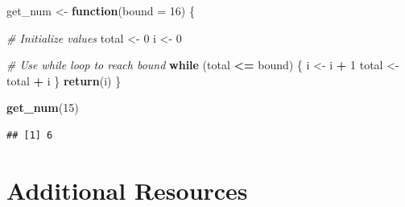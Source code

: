 \documentclass[
]{book}
\newenvironment{Shaded}{\begin{snugshade}}{\end{snugshade}}
\newcommand{\CommentTok}[1]{\textcolor[rgb]{0.56,0.35,0.01}{\textit{#1}}}
\newcommand{\ControlFlowTok}[1]{\textcolor[rgb]{0.13,0.29,0.53}{\textbf{#1}}}
\newcommand{\DataTypeTok}[1]{\textcolor[rgb]{0.13,0.29,0.53}{#1}}
\newcommand{\DecValTok}[1]{\textcolor[rgb]{0.00,0.00,0.81}{#1}}
\newcommand{\KeywordTok}[1]{\textcolor[rgb]{0.13,0.29,0.53}{\textbf{#1}}}
\newcommand{\NormalTok}[1]{#1}
\newcommand{\OperatorTok}[1]{\textcolor[rgb]{0.81,0.36,0.00}{\textbf{#1}}}
\newcommand{\StringTok}[1]{\textcolor[rgb]{0.31,0.60,0.02}{#1}}
\begin{document}
\begin{Shaded}
\begin{Highlighting}[]
\NormalTok{get_num <-}\StringTok{ }\ControlFlowTok{function}\NormalTok{(}\DataTypeTok{bound =} \DecValTok{16}\NormalTok{) \{}

    \CommentTok{# Initialize values}
\NormalTok{    total <-}\StringTok{ }\DecValTok{0}
\NormalTok{    i <-}\StringTok{ }\DecValTok{0}

    \CommentTok{# Use while loop to reach bound}
    \ControlFlowTok{while}\NormalTok{ (total }\OperatorTok{<=}\StringTok{ }\NormalTok{bound) \{}
\NormalTok{        i <-}\StringTok{ }\NormalTok{i }\OperatorTok{+}\StringTok{ }\DecValTok{1}
\NormalTok{        total <-}\StringTok{ }\NormalTok{total }\OperatorTok{+}\StringTok{ }\NormalTok{i}
\NormalTok{    \}}
    \KeywordTok{return}\NormalTok{(i)}
\NormalTok{\}}

\KeywordTok{get_num}\NormalTok{(}\DecValTok{15}\NormalTok{)}
\end{Highlighting}
\end{Shaded}

\begin{verbatim}
## [1] 6
\end{verbatim}

\hypertarget{additional-resources-5}{%
\section{Additional Resources}\label{additional-resources-5}}
\end{document}
